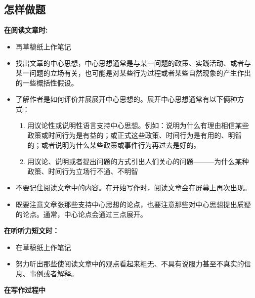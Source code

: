 \documentclass[UTF8]{ctexart}
\begin{document}
\subsection{怎样做题}
\textbf{在阅读文章时:}
\begin{itemize}
  \item 再草稿纸上作笔记
  \item 找出文章的中心思想，中心思想通常是与某一问题的政策、实践活动、或者与某一问题的立场有关，也可能是对某些行为过程或者某些自然现象的产生作出的一些概括性假设。
  \item 了解作者是如何评价并展展开中心思想的。展开中心思想通常有以下俩种方式：
  \begin{enumerate}
    \item 用议论性或说明性语言支持中心思想。例如：说明为什么有理由相信某些政策或时间行为是有益的；或正式这些政策、时间行为是有用的、明智的；或者说明为什么某些政策或事件行为再过去是好的。
    \item 用议论、说明或者提出问题的方式引出人们关心的问题———为什么某种政策、时间行为立场行不通、不明智
  \end{enumerate}
  \item 不要记住阅读文章中的内容。在开始写作时，阅读文章会在屏幕上再次出现。
  \item 既要注意文章张那些支持中心思想的论点，也要注意那些对中心思想提出质疑的论点。通常，中心论点会通过三点展开。
\end{itemize}
\textbf{在听听力短文时：}
\begin{itemize}
  \item 在草稿纸上作笔记
  \item 努力听出那些使阅读文章中的观点看起来粗无、不具有说服力甚至不真实的信息、事例或者解释。
\end{itemize}
\textbf{在写作过程中}
\end{document}
